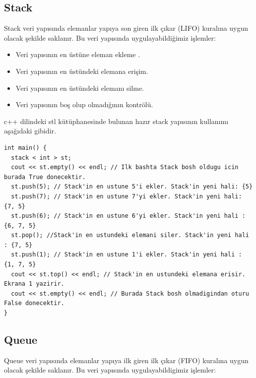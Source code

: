 \documentclass[12pt]{article}
\begin{document}
	\subsection{Stack}
    
    Stack veri yap{\i}s{\i}nda elemanlar yap{\i}ya son giren ilk \c{c}{\i}kar (LIFO) kural{\i}na uygun olacak \c{s}ekilde saklan{\i}r. Bu veri yap{\i}s{\i}nda uygulayabildi\u{g}imiz i\c{s}lemler:
    
    \begin{itemize}
        \item Veri yap{\i}s{\i}n{\i}n en \"{u}st\"{u}ne eleman ekleme .
        \item Veri yap{\i}s{\i}n{\i}n en \"{u}st\"{u}ndeki elemana eri\c{s}im.
        \item Veri yap{\i}s{\i}n{\i}n en \"{u}st\"{u}ndeki eleman{\i} silme.
        \item Veri yap{\i}s{\i}n{\i}n bo\c{s} olup olmad{\i}\u{g}{\i}n{\i}n kontr\"{o}l\"{u}.
    \end{itemize}
    
    c++ dilindeki stl k\"{u}t\"{u}phanesinde bulunan haz{\i}r stack yap{\i}s{\i}n{\i}n kullan{\i}m{\i} a\c{s}a\u{g}{\i}daki gibidir.
    
    \begin{verbatim}
int main() {
  stack < int > st;
  cout << st.empty() << endl; // Ilk bashta Stack bosh oldugu icin burada True donecektir.
  st.push(5); // Stack'in en ustune 5'i ekler. Stack'in yeni hali: {5}
  st.push(7); // Stack'in en ustune 7'yi ekler. Stack'in yeni hali: {7, 5}
  st.push(6); // Stack'in en ustune 6'yi ekler. Stack'in yeni hali : {6, 7, 5}
  st.pop(); //Stack'in en ustundeki elemani siler. Stack'in yeni hali : {7, 5}
  st.push(1); // Stack'in en ustune 1'i ekler. Stack'in yeni hali : {1, 7, 5}
  cout << st.top() << endl; // Stack'in en ustundeki elemana erisir. Ekrana 1 yazirir.  
  cout << st.empty() << endl; // Burada Stack bosh olmadigindan oturu False donecektir.
}
    \end{verbatim}
	
	\subsection{Queue}

    Queue veri yap{\i}s{\i}nda elemanlar yap{\i}ya ilk giren ilk \c{c}{\i}kar (FIFO) kural{\i}na uygun olacak \c{s}ekilde saklan{\i}r. Bu veri yap{\i}s{\i}nda uygulayabildigimiz i\c{s}lemler:
    
\end{document}
